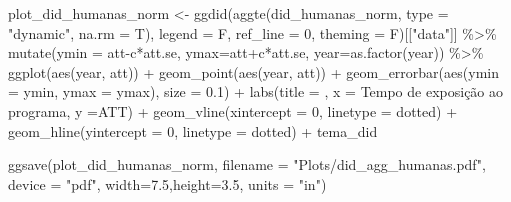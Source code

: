 \documentclass[
  letterpaper,
  DIV=11,
  numbers=noendperiod]{scrartcl}
\newenvironment{Shaded}{\begin{snugshade}}{\end{snugshade}}
\newcommand{\AttributeTok}[1]{\textcolor[rgb]{0.40,0.45,0.13}{#1}}
\newcommand{\DecValTok}[1]{\textcolor[rgb]{0.68,0.00,0.00}{#1}}
\newcommand{\FloatTok}[1]{\textcolor[rgb]{0.68,0.00,0.00}{#1}}
\newcommand{\FunctionTok}[1]{\textcolor[rgb]{0.28,0.35,0.67}{#1}}
\newcommand{\NormalTok}[1]{\textcolor[rgb]{0.00,0.23,0.31}{#1}}
\newcommand{\OtherTok}[1]{\textcolor[rgb]{0.00,0.23,0.31}{#1}}
\newcommand{\SpecialCharTok}[1]{\textcolor[rgb]{0.37,0.37,0.37}{#1}}
\newcommand{\StringTok}[1]{\textcolor[rgb]{0.13,0.47,0.30}{#1}}
\begin{document}
\begin{Shaded}
\begin{Highlighting}[]
\NormalTok{plot\_did\_humanas\_norm }\OtherTok{\textless{}{-}}
\FunctionTok{ggdid}\NormalTok{(}\FunctionTok{aggte}\NormalTok{(did\_humanas\_norm, }\AttributeTok{type =} \StringTok{"dynamic"}\NormalTok{, }\AttributeTok{na.rm =}\NormalTok{ T),       }
      \AttributeTok{legend =}\NormalTok{ F, }\AttributeTok{ref\_line =} \DecValTok{0}\NormalTok{, }\AttributeTok{theming =}\NormalTok{ F)[[}\StringTok{"data"}\NormalTok{]] }\SpecialCharTok{\%\textgreater{}\%} 
    \FunctionTok{mutate}\NormalTok{(}\AttributeTok{ymin =}\NormalTok{ att}\SpecialCharTok{{-}}\NormalTok{c}\SpecialCharTok{*}\NormalTok{att.se, }\AttributeTok{ymax=}\NormalTok{att}\SpecialCharTok{+}\NormalTok{c}\SpecialCharTok{*}\NormalTok{att.se, }\AttributeTok{year=}\FunctionTok{as.factor}\NormalTok{(year)) }\SpecialCharTok{\%\textgreater{}\%} 
    \FunctionTok{ggplot}\NormalTok{(}\FunctionTok{aes}\NormalTok{(year, att)) }\SpecialCharTok{+}
    \FunctionTok{geom\_point}\NormalTok{(}\FunctionTok{aes}\NormalTok{(year, att)) }\SpecialCharTok{+}
    \FunctionTok{geom\_errorbar}\NormalTok{(}\FunctionTok{aes}\NormalTok{(}\AttributeTok{ymin =}\NormalTok{ ymin, }\AttributeTok{ymax =}\NormalTok{ ymax), }\AttributeTok{size =} \FloatTok{0.1}\NormalTok{) }\SpecialCharTok{+}
    \FunctionTok{labs}\NormalTok{(}\AttributeTok{title =} \StringTok{\textquotesingle{}\textquotesingle{}}\NormalTok{,}
         \AttributeTok{x =} \StringTok{\textquotesingle{}Tempo de exposição ao programa\textquotesingle{}}\NormalTok{,}
         \AttributeTok{y =}\StringTok{\textquotesingle{}ATT\textquotesingle{}}\NormalTok{) }\SpecialCharTok{+}
    \FunctionTok{geom\_vline}\NormalTok{(}\AttributeTok{xintercept =} \StringTok{\textquotesingle{}0\textquotesingle{}}\NormalTok{, }\AttributeTok{linetype =} \StringTok{\textquotesingle{}dotted\textquotesingle{}}\NormalTok{) }\SpecialCharTok{+}
    \FunctionTok{geom\_hline}\NormalTok{(}\AttributeTok{yintercept =} \DecValTok{0}\NormalTok{, }\AttributeTok{linetype =} \StringTok{\textquotesingle{}dotted\textquotesingle{}}\NormalTok{) }\SpecialCharTok{+}
\NormalTok{    tema\_did}

\FunctionTok{ggsave}\NormalTok{(plot\_did\_humanas\_norm, }
       \AttributeTok{filename =} \StringTok{"Plots/did\_agg\_humanas.pdf"}\NormalTok{,}
       \AttributeTok{device =} \StringTok{"pdf"}\NormalTok{,}
       \AttributeTok{width=}\FloatTok{7.5}\NormalTok{,}\AttributeTok{height=}\FloatTok{3.5}\NormalTok{, }\AttributeTok{units =} \StringTok{"in"}\NormalTok{)}


\end{Highlighting}
\end{Shaded}
\end{document}
